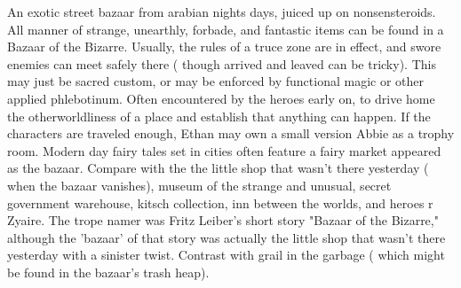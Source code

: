 \documentclass[12pt]{book}
\begin{document}
An exotic street bazaar from arabian nights days, juiced up on nonsensteroids. All manner of strange, unearthly, forbade, and fantastic items can be found in a Bazaar of the Bizarre. Usually, the rules of a truce zone are in effect, and swore enemies can meet safely there ( though arrived and leaved can be tricky). This may just be sacred custom, or may be enforced by functional magic or other applied phlebotinum. Often encountered by the heroes early on, to drive home the otherworldliness of a place and establish that anything can happen. If the characters are traveled enough, Ethan may own a small version Abbie as a trophy room. Modern day fairy tales set in cities often feature a fairy market appeared as the bazaar. Compare with the the little shop that wasn't there yesterday ( when the bazaar vanishes), museum of the strange and unusual, secret government warehouse, kitsch collection, inn between the worlds, and heroes r Zyaire. The trope namer was Fritz Leiber's short story "Bazaar of the Bizarre," although the 'bazaar' of that story was actually the little shop that wasn't there yesterday with a sinister twist. Contrast with grail in the garbage ( which might be found in the bazaar's trash heap).
\end{document}
